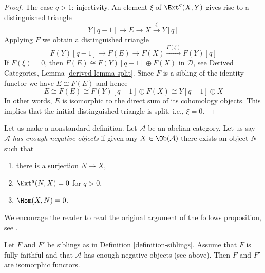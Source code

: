 \begin{proof}
\medskip\noindent
The case $q > 1$: injectivity. An element $\xi$ of $\Ext^q(X, Y)$
gives rise to a distinguished triangle
$$
Y[q - 1] \to E \to X \xrightarrow{\xi} Y[q]
$$
Applying $F$ we obtain a distinguished triangle
$$
F(Y)[q - 1] \to F(E) \to F(X) \xrightarrow{F(\xi)} F(Y)[q]
$$
If $F(\xi) = 0$, then $F(E) \cong F(Y)[q - 1] \oplus F(X)$
in $\mathcal{D}$, see
Derived Categories, Lemma \ref{derived-lemma-split}.
Since $F$ is a sibling of the identity functor we have
$E \cong F(E)$ and hence
$$
E \cong F(E) \cong F(Y)[q - 1] \oplus F(X) \cong Y[q - 1] \oplus X
$$
In other words, $E$ is isomorphic to the
direct sum of its cohomology objects. This implies that the
initial distinguished triangle is split, i.e., $\xi = 0$.
\end{proof}

\noindent
Let us make a nonstandard definition. Let $\mathcal{A}$ be an abelian
category. Let us say $\mathcal{A}$ {\it has enough negative objects}
if given any $X \in \Ob(\mathcal{A})$ there exists an object $N$
such that
\begin{enumerate}
\item there is a surjection $N \to X$,
\item $\Ext^q(N, X) = 0$ for $q > 0$,
\item $\Hom(X, N) = 0$.
\end{enumerate}
We encourage the reader to read the original argument of the
follows proposition, see \cite[Proposition 2.16]{Orlov-K3}.

\begin{proposition}
\label{proposition-siblings-isomorphic}
\begin{reference}
\cite[Proposition 2.16]{Orlov-K3}
\end{reference}
Let $F$ and $F'$ be siblings as in Definition \ref{definition-siblings}.
Assume that $F$ is fully faithful and that $\mathcal{A}$ has enough
negative objects (see above). Then $F$ and $F'$ are isomorphic functors.
\end{proposition}

